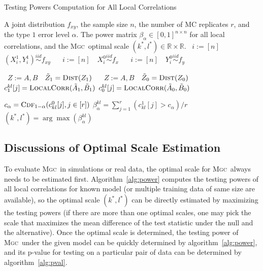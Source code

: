 \documentclass[11pt]{article}
\providecommand{\sct}[1]{{\normalfont\textsc{#1}}}
\newcommand{\Real}{\mathbb{R}}
\newcommand{\G}{c}
\newcommand{\Linefor}[2]{%
    \State \algorithmicfor\ {#1}\ \algorithmicdo\ {#2} \algorithmicend\ \algorithmicfor%
}
\newcommand{\Mgc}{\sct{Mgc}}
\begin{document}
\begin{algorithm}
\caption{Testing Powers Computation for All Local Correlations}
\label{alg:power}
\begin{algorithmic}[1]
\Require A joint distribution $f_{xy}$, the sample size $n$, the number of MC replicates $r$, and the type $1$ error level $\alpha$.
\Ensure The power matrix $\beta_{\alpha} \in [0,1]^{n \times n}$ for all local correlations, and the \Mgc~optimal scale $(k^{*},l^{*}) \in \Real \times \Real$.
\Linefor{$i:=[n]$}{$(X^{1}_{i},Y^{1}_{i}) \stackrel{iid}{\sim} f_{xy}$} 
\Linefor{$i:=[n]$}{$X^{0}_{i} \stackrel{iid}{\sim} f_{x}$} 
\Linefor{$i:=[n]$}{$Y^{0}_{i} \stackrel{iid}{\sim} f_{y}$}
\Linefor{$Z:=A,B$}{$\tilde{Z}_{1}=\textsc{Dist}(Z_{1})$} 
\Linefor{$Z:=A,B$}{$\tilde{Z}_{0}=\textsc{Dist}(Z_{0})$} 
\State $\G^{kl}_{1}[j]=\textsc{LocalCorr}(\tilde{A}_{1},\tilde{B}_{1})$ 
\State $\G^{kl}_{0}[j]=\textsc{LocalCorr}(\tilde{A}_{0},\tilde{B}_{0})$ 
\EndFor

\State $c_{\alpha}=\textsc{Cdf}_{1-\alpha}(\G^{0}_{kl}[j],j \in [r])$ 
\State $\beta_{\alpha}^{kl}=\sum_{j=1}^{r}(\G^{1}_{kl}[j]>c_{\alpha}) / r$ 
\EndFor
\State $(k^{*},l^{*})=\arg\max(\beta_{\alpha}^{kl})$ 
\EndFunction
\end{algorithmic}
\end{algorithm}

\subsection{Discussions of Optimal Scale Estimation}
\label{appen:diss}
To evaluate \Mgc~in simulations or real data, the optimal scale for \Mgc~always needs to be estimated first. Algorithm~\ref{alg:power} computes the testing powers of all local correlations for known model (or multiple training data of same size are available), so the optimal scale $(k^{*},l^{*})$ can be directly estimated by maximizing the testing powers (if there are more than one optimal scales, one may pick the scale that maximizes the mean difference of the test statistic under the null and the alternative). Once the optimal scale is determined, the testing power of \Mgc~under the given model can be quickly determined by algorithm~\ref{alg:power}, and its p-value for testing on a particular pair of data can be determined by algorithm~\ref{alg:pval}.
\end{document}
